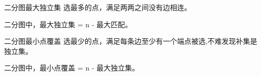二分图最大独立集
选最多的点，满足两两之间没有边相连。

二分图中，最大独立集 = n - 最大匹配。

二分图最小点覆盖
选最少的点，满足每条边至少有一个端点被选,不难发现补集是独立集。

二分图中，最小点覆盖 = n - 最大独立集。